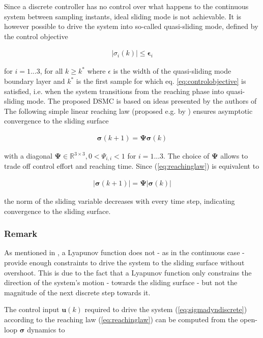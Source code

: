 \documentclass{ifacconf}
\providecommand{\mbf}[1]{\mathbf{#1}}
\newcommand{\idxSample}{{\ensuremath{k}}}
\begin{document}
Since a discrete controller has no control over what happens to the continuous system between sampling instants, ideal sliding mode is not achievable. It is however possible to drive the system into so-called quasi-sliding mode, defined by the control objective

\begin{align}
|{\sigma}_i(\idxSample)| \leq \mbf{\epsilon}_i
\label{eq:controlobjective}
\end{align}

for $i=1...3$, for all $k \geq k^*$ where $\epsilon$ is the width of the quasi-sliding mode boundary layer and $k^*$ is the first sample for which eq. \ref{eq:controlobjective} is satisfied, i.e. when the system transitions from the reaching phase into quasi-sliding mode.
The proposed DSMC is based on ideas presented by the authors of \cite{monsees2001discrete}
The following simple linear reaching law (proposed e.g. by \cite{Spurgeon1992}) ensures asymptotic convergence to the sliding surface

\begin{align}
\mbf{\sigma}(\idxSample+1) = \mbf{\Psi} \mbf{\sigma}(\idxSample)
\label{eq:reachinglaw}
\end{align}

with a diagonal $\mbf{\Psi} \in \mathbb{R}^{3 \times 3}, 0 < \Psi_{i,i} < 1$ for $i=1...3$. The choice of $\mbf{\Psi}$ allows to trade off control effort and reaching time.
Since (\ref{eq:reachinglaw}) is equivalent to

\begin{align}
|\mbf{\sigma}(\idxSample+1)| = \mbf{\Psi} |\mbf{\sigma}(\idxSample)|
\end{align}

the norm of the sliding variable decreases with every time step, indicating convergence to the sliding surface. 

\subsubsection{Remark} As mentioned in \cite{monsees2001discrete}, a Lyapunov function does not - as in the continuous case - provide enough constraints to drive the system to the sliding surface without overshoot. This is due to the fact that a Lyapunov function only constrains the direction of the system's motion - towards the sliding surface - but not the magnitude of the next discrete step towards it. 

The control input $\mbf{u}(\idxSample)$ required to drive the system (\ref{eq:sigmadyndiscrete}) according to the reaching law (\ref{eq:reachinglaw}) can be computed from the open-loop $\mbf{\sigma}$ dynamics to
\end{document}
